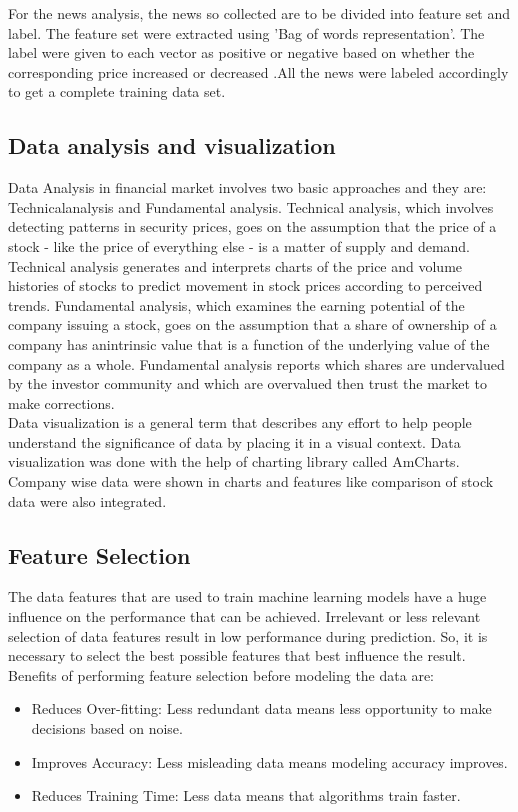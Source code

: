 For the news analysis, the news so collected are to be divided into feature set and label. The feature set were extracted using 'Bag of words representation'. The label were given to each vector as positive or negative based on whether the corresponding price increased or decreased .All the news were labeled accordingly to get a complete training data set.

\subsection{Data analysis and visualization}
Data Analysis in financial market involves two basic approaches and they are: Technicalanalysis and Fundamental analysis. Technical analysis, which involves detecting patterns in security prices, goes on the assumption that the price of a stock - like the price of everything
else - is a matter of supply and demand. Technical analysis generates and interprets charts of the price and volume histories of stocks to predict movement in stock prices according to perceived trends. Fundamental analysis, which examines the earning potential of the company issuing a stock, goes on the assumption that a share of ownership of a company has anintrinsic value that is a function of the underlying value of the company as a whole. Fundamental analysis reports which shares are undervalued by the investor community and which are overvalued then trust the market to make corrections.\\

Data visualization is a general term that describes any effort to help people understand the significance of data by placing it in a visual context. Data visualization was done with the help of charting library called AmCharts. Company wise data were shown in charts and features like comparison of stock data were also integrated.

\subsection{Feature Selection}
The data features that are used to train  machine learning models have a huge influence on the performance that can be achieved. Irrelevant or less relevant selection of data features result in low performance during prediction. So, it is necessary to select the best possible features that best influence the result.\\

Benefits of performing feature selection before modeling the data are:
\begin{itemize}
	\item Reduces Over-fitting: Less redundant data means less opportunity to make decisions based on noise. 
	\item Improves Accuracy: Less misleading data means modeling accuracy improves. 
	\item Reduces Training Time: Less data means that algorithms train faster. 
\end{itemize}

